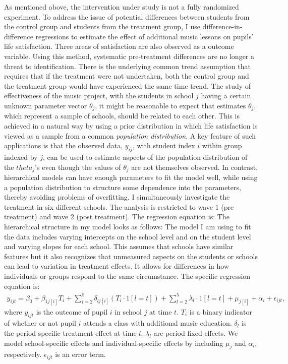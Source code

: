 \documentclass[a4, 12pt]{article}
\begin{document}
\label{sec:model}
As mentioned above, the intervention under study is not a fully randomized experiment. To address the issue of potential differences between students from the control group and students from the treatment group, I use difference-in-difference regressions to estimate the effect of additional music lessons on pupils' life satisfaction. Three areas of satisfaction are also observed as a outcome variable. Using this method, systematic pre-treatment differences are no longer a threat to identification. There is the underlying common trend assumption that requires that if the treatment were not undertaken, both the control group and the treatment group would have experienced the same time trend.
The study of effectiveness of the music project, with the students in school \(j\) having a certain unknown parameter vector \(\theta_j\), it might be reasonable to expect that estimates \(\theta_j\), which represent a sample of schools, should be related to each other. This is achieved in a natural way by using a prior distribution in which life satisfaction is viewed as a sample from a common \emph{population distribution}. A key feature of such applications is that the observed data, \(y_{ij}\), with student index \(i\) within group indexed by \(j\), can be used to estimate aspects of the population distribution of the \(theta_j\)'s even though the values of \(\theta_j\) are not themselves observed. In contrast, hierarchical models can have enough parameters to fit the model well, while using a population distribution to structure some dependence into the parameters, thereby avoiding problems of overfitting.
I simultaneously investigate the treatment in six different schools. The analysis is restricted to wave 1 (pre treatment) and wave 2 (post treatment). The regression equation is:
The hierarchical structure in my model looks as follows:
The model I am using to fit the data includes varying intercepts on the school level and on the student level and varying slopes for each school. This assumes that schools have similar features but it also recognizes that unmeasured aspects on the students or schools can lead to variation in treatment effects. It allows for differences in how individuals or groups respond to the same circumstance. The specific regression equation is:
\begin{align}\label{eq:ml_DDmodel}
y_{ijt} = \beta_0 + \beta_{1j[i]} T_i + \sum\limits_{l=2}^5\delta_{lj[i]} (T_{i} \cdot 1[l=t]) + \sum\limits_{l=2}^5\lambda_l\cdot 1[l=t] + \mu_{j[i]} + \alpha_{i} + \epsilon_{ijt},
\end{align}
where \(y_{ijt}\) is the outcome of pupil \(i\) in school \(j\) at time \(t\). \(T_{i}\) is a binary indicator of whether or not pupil \(i\) attends a class with additional music education. \(\delta_l\) is the period-specific treatment effect at time \(l\). \(\lambda_l\) are period fixed effects. We model school-specific effects and individual-specific effects by including \(\mu_{j}\) and \(\alpha_{i}\), respectively. \(\epsilon_{ijt}\) is an error term.
\end{document}
